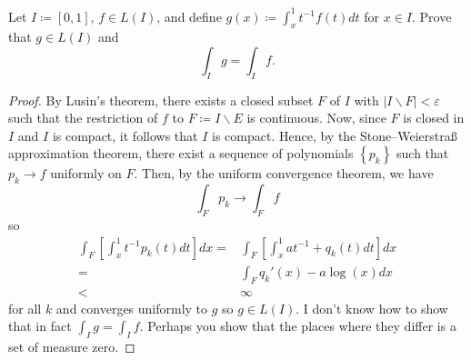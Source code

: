 \begin{problem}
Let $I\coloneqq[0,1]$, $f\in L(I)$, and define $g(x)\coloneqq\int_x^1
t^{-1}f(t) d  t$ for $x\in I$. Prove that $g\in L(I)$ and
\[
\int_I g=\int_I f.
\]
\end{problem}
\begin{proof}
By Lusin's theorem, there exists a closed subset $F$ of $I$ with $|I\smallsetminus
F|<\varepsilon$ such that the restriction of $f$ to $F\coloneqq I\smallsetminus E$
is continuous. Now, since $F$ is closed in $I$ and $I$ is compact, it
follows that $I$ is compact. Hence, by the Stone--Weierstraß approximation
theorem, there exist a sequence of polynomials $\left\{ p_k \right\}$ such
that $p_k\to f$ uniformly on $F$. Then, by the uniform convergence theorem,
we have
\begin{equation}
  \label{eq:uniform-convergence-2-4}
\int_F p_k\longrightarrow \int_F f
\end{equation}
so
\begin{equation}
  \label{eq:uniform-convergence-2-2-4}
\begin{aligned}
\int_F\left[\int_x^1t^{-1}p_k(t) d  t\right] d  x
={}&\int_F\left[\int_x^1 at^{-1}+q_k(t) d  t\right] d  x\\
={}&\int_F q_k'(x)-a\log(x) d  x\\
<{}&\infty
\end{aligned}
\end{equation}
for all $k$ and converges uniformly to $g$ so $g\in L(I)$. I don't know
how to show that in fact $\int_I g=\int_I f$. Perhaps you show that the
places where they differ is a set of measure zero.
\end{proof}

